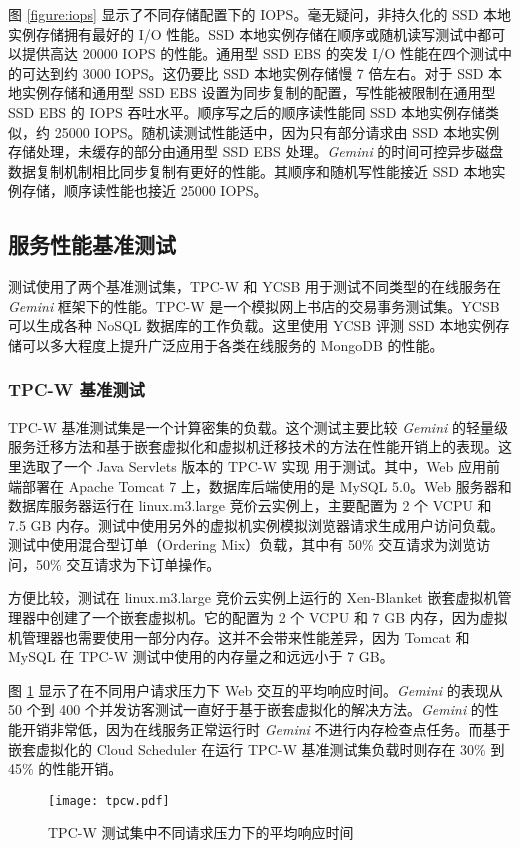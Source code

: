 图 \ref{figure:iops} 显示了不同存储配置下的 IOPS。毫无疑问，非持久化的 SSD 本地实例存储拥有最好的 I/O 性能。SSD 本地实例存储在顺序或随机读写测试中都可以提供高达 20000 IOPS 的性能。通用型 SSD EBS 的突发 I/O 性能在四个测试中的可达到约 3000 IOPS。这仍要比 SSD 本地实例存储慢 7 倍左右。对于 SSD 本地实例存储和通用型 SSD EBS 设置为同步复制的配置，写性能被限制在通用型 SSD EBS 的 IOPS 吞吐水平。顺序写之后的顺序读性能同 SSD 本地实例存储类似，约 25000 IOPS。随机读测试性能适中，因为只有部分请求由 SSD 本地实例存储处理，未缓存的部分由通用型 SSD EBS 处理。\emph{Gemini} 的时间可控异步磁盘数据复制机制相比同步复制有更好的性能。其顺序和随机写性能接近 SSD 本地实例存储，顺序读性能也接近 25000 IOPS。

\subsection{服务性能基准测试}
测试使用了两个基准测试集，TPC-W 和 YCSB 用于测试不同类型的在线服务在 \emph{Gemini} 框架下的性能。TPC-W 是一个模拟网上书店的交易事务测试集。YCSB 可以生成各种 NoSQL 数据库的工作负载。这里使用 YCSB 评测 SSD 本地实例存储可以多大程度上提升广泛应用于各类在线服务的 MongoDB 的性能。

\subsubsection{TPC-W 基准测试}
TPC-W 基准测试集是一个计算密集的负载。这个测试主要比较 \emph{Gemini} 的轻量级服务迁移方法和基于嵌套虚拟化和虚拟机迁移技术的方法在性能开销上的表现。这里选取了一个 Java Servlets 版本的 TPC-W 实现 \cite{JAVATPCW:2014} 用于测试。其中，Web 应用前端部署在 Apache Tomcat 7 上，数据库后端使用的是 MySQL 5.0。Web 服务器和数据库服务器运行在 linux.m3.large 竞价云实例上，主要配置为 2 个 VCPU 和 7.5 GB 内存。测试中使用另外的虚拟机实例模拟浏览器请求生成用户访问负载。测试中使用混合型订单（Ordering Mix）负载，其中有 50\% 交互请求为浏览访问，50\% 交互请求为下订单操作。

方便比较，测试在 linux.m3.large 竞价云实例上运行的 Xen-Blanket \cite{Williams:2012:XVO:2168836.2168849} 嵌套虚拟机管理器中创建了一个嵌套虚拟机。它的配置为 2 个 VCPU 和 7 GB 内存，因为虚拟机管理器也需要使用一部分内存。这并不会带来性能差异，因为 Tomcat 和 MySQL 在 TPC-W 测试中使用的内存量之和远远小于 7 GB。

图 \ref{figure:tpcw} 显示了在不同用户请求压力下 Web 交互的平均响应时间。\emph{Gemini} 的表现从 50 个到 400 个并发访客测试一直好于基于嵌套虚拟化的解决方法。\emph{Gemini} 的性能开销非常低，因为在线服务正常运行时 \emph{Gemini} 不进行内存检查点任务。而基于嵌套虚拟化的 Cloud Scheduler 在运行 TPC-W 基准测试集负载时则存在 30\% 到 45\% 的性能开销。
\begin{figure}[]
  \centering
  \texttt{[image: tpcw.pdf]}
  \caption{TPC-W 测试集中不同请求压力下的平均响应时间}
  \label{figure:tpcw}
\end{figure}


